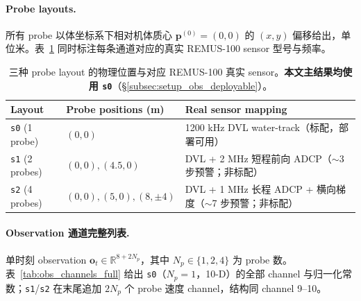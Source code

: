 \paragraph{Probe layouts.}\quad
所有 probe 以体坐标系下相对机体质心 $\mathbf{p}^{(0)}=(0,0)$ 的 $(x, y)$ 偏移给出，单位米。表~\ref{tab:obs_probe_layout} 同时标注每条通道对应的真实 REMUS-100 sensor 型号与频率。

\begin{table}[h]
\centering
\small
\caption{三种 probe layout 的物理位置与对应 REMUS-100 真实 sensor。\textbf{本文主结果均使用 \texttt{s0}}（\S\ref{subsec:setup_obs_deployable}）。}
\label{tab:obs_probe_layout}
\begin{tabular}{lll}
\toprule
\textbf{Layout} & \textbf{Probe positions (m)} & \textbf{Real sensor mapping} \\
\midrule
\texttt{s0} (1 probe)  & $(0, 0)$                       & 1200 kHz DVL water-track（标配，部署可用） \\
\texttt{s1} (2 probes) & $(0, 0), (4.5, 0)$            & DVL + 2 MHz 短程前向 ADCP（$\sim$3 步预警；非标配） \\
\texttt{s2} (4 probes) & $(0, 0), (5, 0), (8, \pm 4)$  & DVL + 1 MHz 长程 ADCP + 横向梯度（$\sim$7 步预警；非标配） \\
\bottomrule
\end{tabular}
\end{table}

\paragraph{Observation 通道完整列表.}\quad
单时刻 observation $\mathbf{o}_t \in \mathbb{R}^{8 + 2 N_p}$，其中 $N_p \in \{1, 2, 4\}$ 为 probe 数。表~\ref{tab:obs_channels_full} 给出 \texttt{s0}（$N_p = 1$，10-D）的全部 channel 与归一化常数；\texttt{s1}/\texttt{s2} 在末尾追加 $2 N_p$ 个 probe 速度 channel，结构同 channel 9--10。

